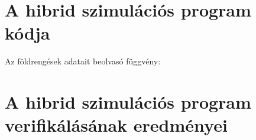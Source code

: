 \chapter{A hibrid szimulációs program kódja}\label{chap: függ hibrid prog}


 
 

 
 
 
 
 
 
 
 
 Az  földrengések adatait beolvasó függvény:
 

 
 
\chapter{A hibrid szimulációs program verifikálásának eredményei}\label{chap: függ hibrid verifikáció}